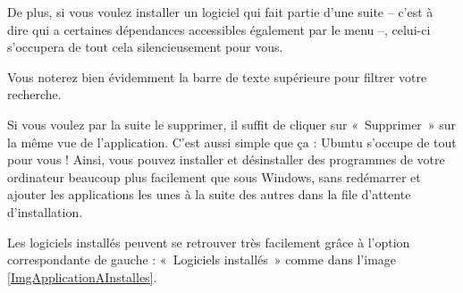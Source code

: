 De plus, si vous voulez installer un logiciel qui fait partie d'une suite -- c'est à dire qui a certaines dépendances accessibles également par le menu --, celui-ci s'occupera de tout cela silencieusement pour vous.\par
{}
\begin{nota}
Vous noterez bien évidemment la barre de texte supérieure pour filtrer votre recherche.
\end{nota}
Si vous voulez par la suite le supprimer, il suffit de cliquer sur «~Supprimer~» sur la même vue de l'application. C'est aussi simple que ça : Ubuntu s'occupe de tout pour vous ! Ainsi, vous pouvez installer et désinstaller des programmes de votre ordinateur beaucoup plus facilement que sous Windows, sans redémarrer et ajouter les applications les unes à la suite des autres dans la file d'attente d'installation.\par
Les logiciels installés peuvent se retrouver très facilement grâce à l'option correspondante de gauche : «~Logiciels installés~» comme dans l'image \ref{ImgApplicationAInstalles}.
